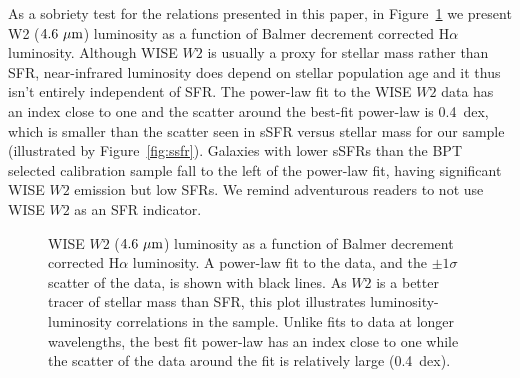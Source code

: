 \documentclass[preprint]{aastex61}
\begin{document}
As a sobriety test for the relations presented in this paper, in Figure~\ref{fig:w12} we present W2 ($4.6~{\rm \mu m}$) luminosity as a function of Balmer decrement corrected H$\alpha$ luminosity. Although WISE $W2$ is usually a proxy for stellar mass rather than SFR, near-infrared luminosity does depend on stellar population age \citep[e.g.,][]{bc03} and it thus isn't entirely independent of SFR. The power-law fit to the WISE $W2$ data has an index close to one and the scatter around the best-fit power-law is 0.4~dex, which is smaller than the scatter seen in sSFR versus stellar mass for our sample (illustrated by Figure~\ref{fig:ssfr}). Galaxies with lower sSFRs than the BPT selected calibration sample fall to the left of the power-law fit, having significant WISE $W2$ emission but low SFRs. We remind adventurous readers to not use WISE $W2$ as an SFR indicator. 

\begin{figure}
\caption{WISE $W2$ ($4.6~{\rm \mu m}$) luminosity as a function of Balmer decrement corrected H$\alpha$ luminosity. A power-law fit to the data, and the $\pm 1 \sigma$ scatter of the data, is shown with black lines. As $W2$ is a better tracer of stellar mass than SFR, this plot illustrates luminosity-luminosity correlations in the sample. Unlike fits to data at longer wavelengths, the best fit power-law has an index close to one while the scatter of the data around the fit is relatively large (0.4~dex).}
\label{fig:w12}
\end{figure}

\end{document}
